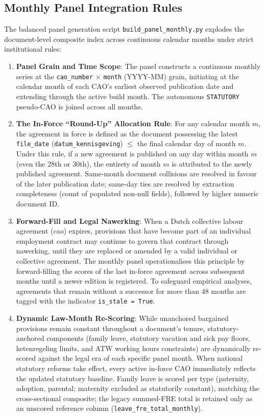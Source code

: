 \subsection{Monthly Panel Integration Rules}
\label{sec:panel_integration}

The balanced panel generation script \nolinkurl{build_panel_monthly.py} explodes the document-level composite index across continuous calendar months under strict institutional rules:

\begin{enumerate}[leftmargin=1.8em]
  \item \textbf{Panel Grain and Time Scope}:
    The panel constructs a continuous monthly series at the \nolinkurl{cao_number} $\times$ \nolinkurl{month} (YYYY-MM) grain, initiating at the calendar month of each CAO's earliest observed publication date and extending through the active build month. The autonomous \texttt{STATUTORY} pseudo-CAO is joined across all months.

  \item \textbf{The In-Force ``Round-Up'' Allocation Rule}:
    For any calendar month $m$, the agreement in force is defined as the document possessing the latest \nolinkurl{file_date} (\nolinkurl{datum_kennisgeving}) $\le$ the final calendar day of month $m$. Under this rule, if a new agreement is published on any day within month $m$ (even the 28th or 30th), the entirety of month $m$ is attributed to the newly published agreement. Same-month document collisions are resolved in favour of the later publication date; same-day ties are resolved by extraction completeness (count of populated non-null fields), followed by higher numeric document ID.

  \item \textbf{Forward-Fill and Legal Nawerking}:
    When a Dutch collective labour agreement (cao) expires, provisions that have become part of an individual employment contract may continue to govern that contract through nawerking, until they are replaced or amended by a valid individual or collective agreement. The monthly panel operationalises this principle by forward-filling the scores of the last in-force agreement across subsequent months until a newer edition is registered. To safeguard empirical analyses, agreements that remain without a successor for more than 48 months are tagged with the indicator \nolinkurl{is_stale = True}.

  \item \textbf{Dynamic Law-Month Re-Scoring}:
    While unanchored bargained provisions remain constant throughout a document's tenure, statutory-anchored components (family leave, statutory vacation and sick pay floors, ketenregeling limits, and ATW working hours constraints) are dynamically re-scored against the legal era of each specific panel month. When national statutory reforms take effect, every active in-force CAO immediately reflects the updated statutory baseline. Family leave is scored per type (paternity, adoption, parental; maternity excluded as statutorily constant), matching the cross-sectional composite; the legacy summed-FRE total is retained only as an unscored reference column (\nolinkurl{leave_fre_total_monthly}).


\end{enumerate}
